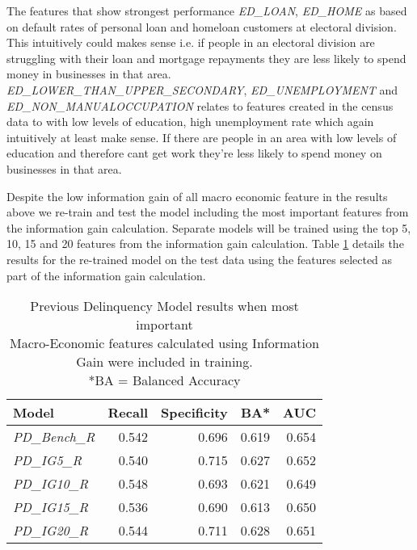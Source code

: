 The features that show strongest performance \textit{ED\_LOAN}, \textit{ED\_HOME} as based on default rates of personal loan and homeloan customers at electoral division. This intuitively could makes sense i.e. if people in an electoral division are struggling with their loan and mortgage repayments they are less likely to spend money in businesses in that area. \textit{ED\_LOWER\_THAN\_UPPER\_SECONDARY}, \textit{ED\_UNEMPLOYMENT} and \textit{ED\_NON\_MANUALOCCUPATION} relates to features created in the census data to with low levels of education, high unemployment rate which again intuitively at least make sense. If there are people in an area with low levels of education and therefore cant get work they're less likely to spend money on businesses in that area.

Despite the low information gain of all macro economic feature in the results above we re-train and test the model including the most important features from the information gain calculation. Separate models will be trained using the top 5, 10, 15 and 20 features from the information gain calculation. Table \ref{table:InfoGainPDModelResults} details the results for the re-trained model on the test data using the features selected as part of the information gain calculation.

\begin{table}[H]
\centering
\small
		\begin{tabular}{l r r r r}
			\hline
			\textbf{Model} & \textbf{Recall} & \textbf{Specificity} & \textbf{BA*} & \textbf{AUC}  \\ \hline
			\textit{PD\_Bench\_R} & 0.542 & 0.696 & 0.619 & \cellcolor{green!25}0.654 \\ \hline
			\textit{PD\_IG5\_R} & 0.540 & \cellcolor{green!25}0.715 & 0.627 & 0.652   \\ 
			\textit{PD\_IG10\_R} & \cellcolor{green!25}0.548 & 0.693 & 0.621 & 0.649  \\ 
			\textit{PD\_IG15\_R} & 0.536 & 0.690 & 0.613 & 0.650  \\
			\textit{PD\_IG20\_R} & 0.544 & 0.711 & \cellcolor{green!25}0.628 & 0.651 \\\hline 
		\end{tabular}
	\caption{Previous Delinquency Model results when most important \\Macro-Economic features calculated using Information Gain were included in training.\\
		*BA = Balanced Accuracy}
	\label{table:InfoGainPDModelResults}
\end{table}

